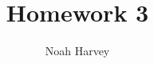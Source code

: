\documentclass[a4paper,titlepage]{article}
\begin{document}
	\title{Homework 3}
	\author{Noah Harvey}
	\maketitle

	
\end{document}
